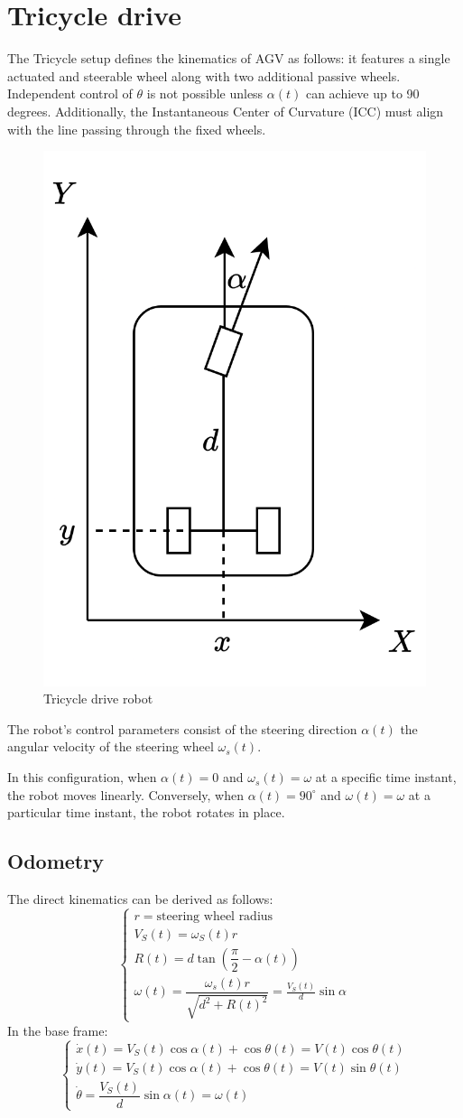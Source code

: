 \section{Tricycle drive}

The Tricycle setup defines the kinematics of AGV as follows: it features a single actuated and steerable wheel along with two additional passive wheels. 
Independent control of $\theta$ is not possible unless $\alpha(t)$ can achieve up to 90 degrees. 
Additionally, the Instantaneous Center of Curvature (ICC) must align with the line passing through the fixed wheels.
\begin{figure}[H]
    \centering
    \includegraphics[width=0.3\linewidth]{images/td.png} 
    \caption{Tricycle drive robot}
\end{figure}
The robot's control parameters consist of the steering direction $\alpha(t)$ the angular velocity of the steering wheel $\omega_s(t)$. 

In this configuration, when $\alpha(t)=0$ and $\omega_s(t)=\omega$ at a specific time instant, the robot moves linearly. 
Conversely, when $\alpha(t)=90^\circ$ and $\omega(t)=\omega$ at a particular time instant, the robot rotates in place. 

\subsection{Odometry}
The direct kinematics can be derived as follows: 
\[\begin{cases}
    r = \text{steering wheel radius} \\
    V_S(t)=\omega_S(t)r \\
    R(t)=d\tan\left(\dfrac{\pi}{2}-\alpha(t)\right) \\
    \omega(t)=\dfrac{\omega_s(t)r}{\sqrt{d^2+R(t)^2}}=\frac{V_S(t)}{d}\sin\alpha
\end{cases}\]
In the base frame: 
\[\begin{cases}
    \dot{x}(t)=V_S(t)\cos\alpha(t)+\cos\theta(t)=V(t)\cos\theta(t) \\
    \dot{y}(t)=V_S(t)\cos\alpha(t)+\cos\theta(t)=V(t)\sin\theta(t) \\
    \dot{\theta}=\dfrac{V_S(t)}{d}\sin\alpha(t)=\omega(t)
\end{cases}\]